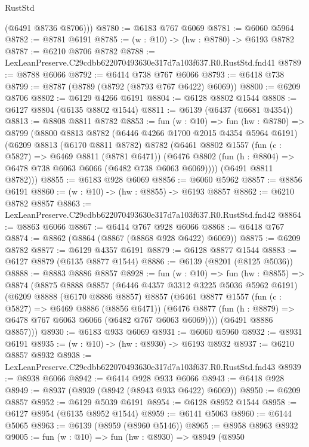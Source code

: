 \begin{lexlean}{RustStd}
\begin{coremodule}
        (@6491 @8736 @8706)))
@8780 := @6183 @767 @6069
@8781 := @6060 @5964
@8782 := @8781 @6191
@8785 := (w : @10) -> (hw : @8780) -> @6193 @8782
@8787 := @6210 @8706 @8782
@8788 := LexLeanPreserve.C29cdbb622070493630e317d7a103f637.R0.RustStd.fnd41
@8789 := @8788 @6066
@8792 := @6414 @738 @767 @6066
@8793 := @6418 @738
@8799 := @8787 (@8789 (@8792 (@8793 @767 @6422) @6069))
@8800 := @6209 @8706
@8802 := @6129 @4266 @6191
@8804 := @6128 @8802 @1544
@8808 := @6127 @8804 (@6135 @8802 @1544)
@8811 := @6139 (@6437 (@6681 @4354))
@8813 := @8808 @8811 @8782
@8853 := fun (w : @10) =>
  fun (hw : @8780) =>
  @8799
    (@8800
      @8813
      @8782
      (@6446 @4266 @1700 @2015 @4354 @5964 @6191)
      (@6209
        @8813
        (@6170 @8811 @8782)
        @8782
        (@6461
          @8802
          @1557
          (fun (c : @5827) => @6469 @8811 (@8781 @6471))
          (@6476 @8802 (fun (h : @8804) => @6478 @738 @6063 @6066 (@6482 @738 @6063 @6069))))
        (@6491 @8811 @8782)))
@8855 := @6183 @928 @6069
@8856 := @6060 @5962
@8857 := @8856 @6191
@8860 := (w : @10) -> (hw : @8855) -> @6193 @8857
@8862 := @6210 @8782 @8857
@8863 := LexLeanPreserve.C29cdbb622070493630e317d7a103f637.R0.RustStd.fnd42
@8864 := @8863 @6066
@8867 := @6414 @767 @928 @6066
@8868 := @6418 @767
@8874 := @8862 (@8864 (@8867 (@8868 @928 @6422) @6069))
@8875 := @6209 @8782
@8877 := @6129 @4357 @6191
@8879 := @6128 @8877 @1544
@8883 := @6127 @8879 (@6135 @8877 @1544)
@8886 := @6139 (@8201 (@8125 @5036))
@8888 := @8883 @8886 @8857
@8928 := fun (w : @10) =>
  fun (hw : @8855) =>
  @8874
    (@8875
      @8888
      @8857
      (@6446 @4357 @3312 @3225 @5036 @5962 @6191)
      (@6209
        @8888
        (@6170 @8886 @8857)
        @8857
        (@6461
          @8877
          @1557
          (fun (c : @5827) => @6469 @8886 (@8856 @6471))
          (@6476 @8877 (fun (h : @8879) => @6478 @767 @6063 @6066 (@6482 @767 @6063 @6069))))
        (@6491 @8886 @8857)))
@8930 := @6183 @933 @6069
@8931 := @6060 @5960
@8932 := @8931 @6191
@8935 := (w : @10) -> (hw : @8930) -> @6193 @8932
@8937 := @6210 @8857 @8932
@8938 := LexLeanPreserve.C29cdbb622070493630e317d7a103f637.R0.RustStd.fnd43
@8939 := @8938 @6066
@8942 := @6414 @928 @933 @6066
@8943 := @6418 @928
@8949 := @8937 (@8939 (@8942 (@8943 @933 @6422) @6069))
@8950 := @6209 @8857
@8952 := @6129 @5039 @6191
@8954 := @6128 @8952 @1544
@8958 := @6127 @8954 (@6135 @8952 @1544)
@8959 := @6141 @5063
@8960 := @6144 @5065
@8963 := @6139 (@8959 (@8960 @5146))
@8965 := @8958 @8963 @8932
@9005 := fun (w : @10) =>
  fun (hw : @8930) =>
  @8949
    (@8950

\end{coremodule}
\end{lexlean}

